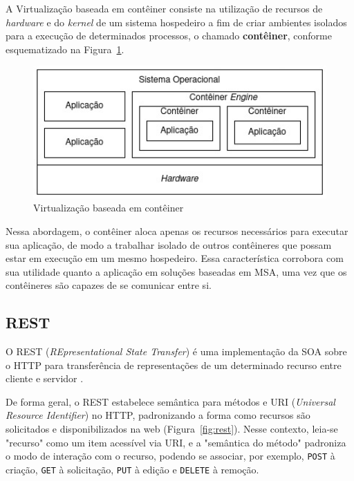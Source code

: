\documentclass[12pt]{article}
\begin{document}
A Virtualização baseada em contêiner \cite{eder2016} consiste na utilização de recursos de \textit{hardware} e do \textit{kernel} de um sistema hospedeiro a fim de criar ambientes isolados para a execução de determinados processos, o chamado \textbf{contêiner}, conforme esquematizado na Figura~\ref{fig:conteiner}.

\begin{figure}[ht]
	\centering
	\includegraphics[width=1\textwidth]{conteiner.jpg}
	\caption{Virtualização baseada em contêiner}
	\label{fig:conteiner}
\end{figure} 

Nessa abordagem, o contêiner aloca apenas os recursos necessários para executar sua aplicação, de modo a trabalhar isolado de outros contêineres que possam estar em execução em um mesmo hospedeiro. Essa característica corrobora com sua utilidade quanto a aplicação em soluções baseadas em MSA, uma vez que os contêineres são capazes de se comunicar entre si.

\subsection{REST}

O REST (\textit{REpresentational State Transfer}) é uma implementação da SOA sobre o HTTP para transferência de representações de um determinado recurso entre cliente e servidor \cite{mumbaikar2013}.

De forma geral, o REST estabelece semântica para métodos e URI (\textit{Universal Resource Identifier}) no HTTP, padronizando a forma como recursos são solicitados e disponibilizados na web (Figura~\ref{fig:rest}). Nesse contexto, leia-se "recurso" como um item acessível via URI, e a "semântica do método" padroniza o modo de interação com o recurso, podendo se associar, por exemplo, \texttt{POST} à criação, \texttt{GET} à solicitação, \texttt{PUT} à edição e \texttt{DELETE} à remoção\cite{adamczyk2011}.
\end{document}
